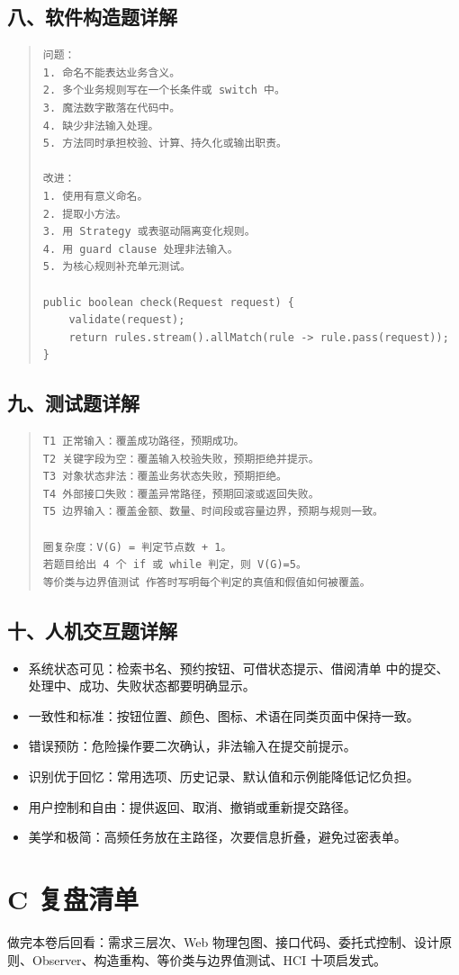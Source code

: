\documentclass[UTF8,zihao=-4]{ctexart}
\begin{document}
\subsection{八、软件构造题详解}


\begin{quote}
\footnotesize
\begin{verbatim}
问题：
1. 命名不能表达业务含义。
2. 多个业务规则写在一个长条件或 switch 中。
3. 魔法数字散落在代码中。
4. 缺少非法输入处理。
5. 方法同时承担校验、计算、持久化或输出职责。

改进：
1. 使用有意义命名。
2. 提取小方法。
3. 用 Strategy 或表驱动隔离变化规则。
4. 用 guard clause 处理非法输入。
5. 为核心规则补充单元测试。

public boolean check(Request request) {
    validate(request);
    return rules.stream().allMatch(rule -> rule.pass(request));
}
\end{verbatim}
\end{quote}



\subsection{九、测试题详解}


\begin{quote}
\footnotesize
\begin{verbatim}
T1 正常输入：覆盖成功路径，预期成功。
T2 关键字段为空：覆盖输入校验失败，预期拒绝并提示。
T3 对象状态非法：覆盖业务状态失败，预期拒绝。
T4 外部接口失败：覆盖异常路径，预期回滚或返回失败。
T5 边界输入：覆盖金额、数量、时间段或容量边界，预期与规则一致。

圈复杂度：V(G) = 判定节点数 + 1。
若题目给出 4 个 if 或 while 判定，则 V(G)=5。
等价类与边界值测试 作答时写明每个判定的真值和假值如何被覆盖。
\end{verbatim}
\end{quote}



\subsection{十、人机交互题详解}


\begin{itemize}
\item 系统状态可见：检索书名、预约按钮、可借状态提示、借阅清单 中的提交、处理中、成功、失败状态都要明确显示。
\item 一致性和标准：按钮位置、颜色、图标、术语在同类页面中保持一致。
\item 错误预防：危险操作要二次确认，非法输入在提交前提示。
\item 识别优于回忆：常用选项、历史记录、默认值和示例能降低记忆负担。
\item 用户控制和自由：提供返回、取消、撤销或重新提交路径。
\item 美学和极简：高频任务放在主路径，次要信息折叠，避免过密表单。
\end{itemize}



\section{C 复盘清单}


做完本卷后回看：需求三层次、Web 物理包图、接口代码、委托式控制、设计原则、Observer、构造重构、等价类与边界值测试、HCI 十项启发式。
\end{document}
